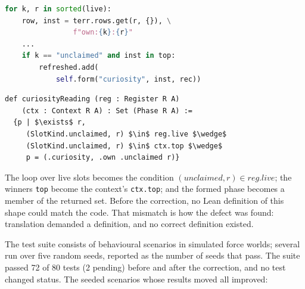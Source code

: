 \documentclass[11pt]{article}
\newcommand{\leanus}{\textunderscore\allowbreak}
\newcommand{\lean}[1]{{\let\_\leanus\texttt{#1}}}
\theoremstyle{remark}
\begin{document}
\noindent
\begin{minipage}[t]{0.47\textwidth}
\begin{lstlisting}[language=Python, mathescape=false, basicstyle=\ttfamily\footnotesize, xleftmargin=0pt]
for k, r in sorted(live):
    row, inst = terr.rows.get(r, {}), \
                f"own:{k}:{r}"
    ...
    if k == "unclaimed" and inst in top:
        refreshed.add(
            self.form("curiosity", inst, rec))
\end{lstlisting}
\end{minipage}\hfill
\begin{minipage}[t]{0.5\textwidth}
\begin{lstlisting}[basicstyle=\ttfamily\footnotesize, xleftmargin=0pt]
def curiosityReading (reg : Register R A)
    (ctx : Context R A) : Set (Phase R A) :=
  {p | $\exists$ r,
     (SlotKind.unclaimed, r) $\in$ reg.live $\wedge$
     (SlotKind.unclaimed, r) $\in$ ctx.top $\wedge$
     p = (.curiosity, .own .unclaimed r)}
\end{lstlisting}
\end{minipage}

\medskip
The loop over live slots becomes the condition $(\mathit{unclaimed}, r) \in
\mathit{reg.live}$; the winners \lean{top} become the context's \lean{ctx.top}; and the
formed phase becomes a member of the returned set. Before the correction, no Lean
definition of this shape could match the code. That mismatch is how the defect was found:
translation demanded a definition, and no correct definition existed.

The test suite consists of behavioural scenarios in simulated force worlds; several run
over five random seeds, reported as the number of seeds that pass. The suite passed 72 of
80 tests (2 pending) before and after the correction, and no test changed status. The
seeded scenarios whose results moved all improved:
\end{document}
